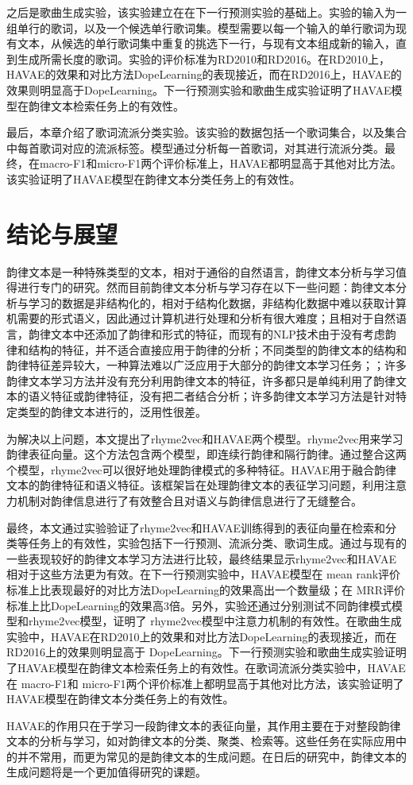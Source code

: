 之后是歌曲生成实验，该实验建立在在下一行预测实验的基础上。实验的输入为一组单行的歌词，以及一个候选单行歌词集。模型需要以每一个输入的单行歌词为现有文本，从候选的单行歌词集中重复的挑选下一行，与现有文本组成新的输入，直到生成所需长度的歌词。实验的评价标准为RD2010和RD2016。在RD2010上，HAVAE的效果和对比方法DopeLearning的表现接近，而在RD2016上，HAVAE的效果则明显高于DopeLearning。下一行预测实验和歌曲生成实验证明了HAVAE模型在韵律文本检索任务上的有效性。\par

最后，本章介绍了歌词流派分类实验。该实验的数据包括一个歌词集合，以及集合中每首歌词对应的流派标签。模型通过分析每一首歌词，对其进行流派分类。最终，在macro-F1和micro-F1两个评价标准上，HAVAE都明显高于其他对比方法。该实验证明了HAVAE模型在韵律文本分类任务上的有效性。\par

\chapter{结论与展望} \label{chpt:conclusion}
韵律文本是一种特殊类型的文本，相对于通俗的自然语言，韵律文本分析与学习值得进行专门的研究。然而目前韵律文本分析与学习存在以下一些问题：韵律文本分析与学习的数据是非结构化的，相对于结构化数据，非结构化数据中难以获取计算机需要的形式语义，因此通过计算机进行处理和分析有很大难度；且相对于自然语言，韵律文本中还添加了韵律和形式的特征，而现有的NLP技术由于没有考虑韵律和结构的特征，并不适合直接应用于韵律的分析；不同类型的韵律文本的结构和韵律特征差异较大，一种算法难以广泛应用于大部分的韵律文本学习任务；；许多韵律文本学习方法并没有充分利用韵律文本的特征，许多都只是单纯利用了韵律文本的语义特征或韵律特征，没有把二者结合分析；许多韵律文本学习方法是针对特定类型的韵律文本进行的，泛用性很差。\par

为解决以上问题，本文提出了rhyme2vec和HAVAE两个模型。rhyme2vec用来学习韵律表征向量。这个方法包含两个模型，即连续行韵律和隔行韵律。通过整合这两个模型，rhyme2vec可以很好地处理韵律模式的多种特征。HAVAE用于融合韵律文本的韵律特征和语义特征。该框架旨在处理韵律文本的表征学习问题，利用注意力机制对韵律信息进行了有效整合且对语义与韵律信息进行了无缝整合。\par

最终，本文通过实验验证了rhyme2vec和HAVAE训练得到的表征向量在检索和分类等任务上的有效性，实验包括下一行预测、流派分类、歌词生成。通过与现有的一些表现较好的韵律文本学习方法进行比较，最终结果显示rhyme2vec和HAVAE相对于这些方法更为有效。在下一行预测实验中，HAVAE模型在 mean rank评价标准上比表现最好的对比方法DopeLearning的效果高出一个数量级；在 MRR评价标准上比DopeLearning的效果高3倍。另外，实验还通过分别测试不同韵律模式模型和rhyme2vec模型，证明了 rhyme2vec模型中注意力机制的有效性。在歌曲生成实验中，HAVAE在RD2010上的效果和对比方法DopeLearning的表现接近，而在RD2016上的效果则明显高于 DopeLearning。下一行预测实验和歌曲生成实验证明了HAVAE模型在韵律文本检索任务上的有效性。在歌词流派分类实验中，HAVAE在 macro-F1和 micro-F1两个评价标准上都明显高于其他对比方法，该实验证明了HAVAE模型在韵律文本分类任务上的有效性。\par

HAVAE的作用只在于学习一段韵律文本的表征向量，其作用主要在于对整段韵律文本的分析与学习，如对韵律文本的分类、聚类、检索等。这些任务在实际应用中的并不常用，而更为常见的是韵律文本的生成问题。在日后的研究中，韵律文本的生成问题将是一个更加值得研究的课题。\par

